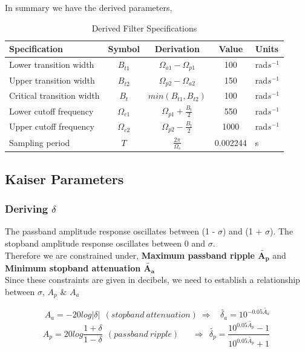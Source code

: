 \documentclass[11pt]{article}
\begin{document}
In summary we have the derived parameters, 
\begin{center}
    \begin{table}[h]
    \centering
    \caption {Derived Filter Specifications}
    \begin{tabular}{@{}lcccl@{}}
        \toprule
            {Specification} & {Symbol} & {Derivation} & {Value} & {Units}  \\
            \midrule
            Lower transition width & $B_{t1}$           & $\Omega_{a1}-\Omega_{p1}$   & 100     & rad$s^{-1}$  \\
            Upper transition width & $B_{t2}$           & $\Omega_{p2}-\Omega_{a2}$   & 150     & rad$s^{-1}$  \\
            Critical transition width & $B_t$           & $ min( B_{t1} ,B_{t2})$        & 100     & rad$s^{-1}$  \\
            Lower cutoff frequency & $\Omega_{c1}$      & $\Omega_{p1}+\frac{B_t}{2}$ & 550     & rad$s^{-1}$  \\
            Upper cutoff frequency & $\Omega_{c2}$      & $\Omega_{p2}-\frac{B_t}{2}$ & 1000    & rad$s^{-1}$  \\
            Sampling period & $T$                       & $\frac{2\pi}{\Omega_s}$     & 0.002244  & s  \\
        \bottomrule
    \end{tabular}
    \end{table}
    \end{center}

\subsection{Kaiser Parameters}
\subsubsection{Deriving $\delta$}
The passband amplitude response oscillates between (1 - $\sigma$) and (1 + $\sigma$). The stopband amplitude response oscillates between 0 and $\sigma$.
\\Therefore we are constrained under, {\bf Maximum passband ripple $\mathbf{\tilde{A_p}}$} and {\bf Minimum stopband attenuation $\mathbf{\tilde{A_a}}$ }
\\Since these constraints are given in decibels, we need to establish a relationship between $\sigma$,
 ${A_p}$ \& ${A_a}$

$$A_{a} =-20log|\delta | \ \  (stopband \ attenuation)\  \Rightarrow \ \ \ \ \tilde{\delta _{a}} =10^{-0.05\tilde{A_{a}}} $$
$$A_{p} =20log\frac{1+\delta }{1-\delta } \ \ (passband \ ripple)\ \ \ \ \ \ \ \Rightarrow \ \  \tilde{\delta _{p}} =\frac{10^{0.05\tilde{A_{p}}} -1}{10^{0.05\tilde{A_{p}}} +1} \ 
$$
\end{document}
